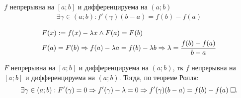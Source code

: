 \documentclass{article}
\begin{document}

\theorem[Лагранжа]

$f$ непрерывна на $[a;b]$ и дифференцируема на $(a;b)$
\begin{align*}
	\exists \gamma\in(a;b):f'(\gamma)(b-a)=f(b)-f(a)
\end{align*}

\proof
\begin{align*}
	 & F(x):=f(x)-\lambda x \land F(a)=F(b)                                             \\
	 & F(a)=F(b) \Rightarrow f(a)-\lambda a=f(b)-\lambda b\Rightarrow \lambda=\frac{f(b)-f(a)}{b-a}
\end{align*}

$F$ непрерывна на $[a;b]$ и дифференцируема на $(a;b)$, тк $f$ непрерывна на $[a;b]$ и дифференцируема на $(a;b)$. Тогда, по теореме Ролля:
\begin{align*}
	\exists\gamma\in(a;b):F'(\gamma)=0 \Rightarrow f'(\gamma)-\lambda=0\Rightarrow f'(\gamma)(b-a)=f(b)-f(a)\;\square.
\end{align*}
\end{document}
